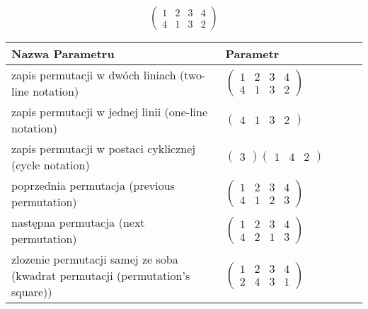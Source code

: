 \documentclass[12pt]{article}
\begin{document}
\subsection{}
\begin{center}
\[
\begin{pmatrix}
	1 & 2 & 3 & 4 \\ 
	4 & 1 & 3 & 2 
\end{pmatrix}
\]

\begin{tabular}{|m{0.6\linewidth}|m{0.4\linewidth}|}
	\hline
	Nazwa Parametru & Parametr \\
	\hline
	zapis permutacji w dwóch liniach (two-line notation) & $\begin{pmatrix} 1 & 2 & 3 & 4 \\ 
4 & 1 & 3 & 2 \end{pmatrix}$ \\ 
	\hline
	zapis permutacji w jednej linii (one-line notation) & $\begin{pmatrix} 4 & 1 & 3 & 2 \end{pmatrix}$ \\ 
	\hline
	zapis permutacji w postaci cyklicznej (cycle notation) & $\begin{pmatrix} 3 \end{pmatrix} \begin{pmatrix} 1 & 4 & 2 \end{pmatrix} $ \\ 
	\hline
	poprzednia permutacja (previous permutation) & $\begin{pmatrix} 1 & 2 & 3 & 4 \\ 
4 & 1 & 2 & 3 \end{pmatrix}$ \\ 
	\hline
	następna permutacja (next permutation) & $\begin{pmatrix} 1 & 2 & 3 & 4 \\ 
4 & 2 & 1 & 3 \end{pmatrix}$ \\ 
	\hline
	zlozenie permutacji samej ze soba (kwadrat permutacji (permutation's square)) & $\begin{pmatrix} 1 & 2 & 3 & 4 \\ 
2 & 4 & 3 & 1 \end{pmatrix}$ \\ 
	\hline
\end{tabular}
\end{center}
\end{document}
